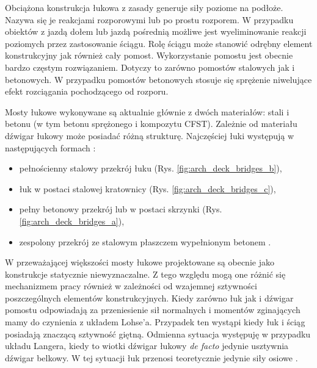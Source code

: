 Obciążona konstrukcja łukowa z zasady generuje siły poziome na podłoże. Nazywa się je reakcjami rozporowymi lub po prostu rozporem. W przypadku obiektów z jazdą dołem lub jazdą pośrednią możliwe jest wyeliminowanie reakcji poziomych przez zastosowanie ściągu. Rolę ściągu może stanowić odrębny element konstrukcyjny jak również cały pomost. Wykorzystanie pomostu jest obecnie bardzo częstym rozwiązaniem. Dotyczy to zarówno pomostów stalowych jak i betonowych. W przypadku pomostów betonowych stosuje się sprężenie niwelujące efekt rozciągania pochodzącego od rozporu.

Mosty łukowe wykonywane są aktualnie głównie z dwóch materiałów: stali i betonu (w tym betonu sprężonego i kompozytu CFST). Zależnie od materiału dźwigar łukowy może posiadać różną strukturę. Najczęściej łuki występują w następujących formach \parencite{Cholewo1965}:
\begin{itemize}
	\item pełnościenny stalowy przekrój łuku (Rys. \ref{fig:arch_deck_bridges_b}),
	\item łuk w postaci stalowej kratownicy (Rys. \ref{fig:arch_deck_bridges_c}),
	\item pełny betonowy przekrój lub w postaci skrzynki (Rys. \ref{fig:arch_deck_bridges_a}),
	\item zespolony przekrój ze stalowym płaszczem wypełnionym betonem  \parencite{Abramski2019}.
\end{itemize}

W przeważającej większości mosty łukowe projektowane są obecnie jako konstrukcje statycznie niewyznaczalne. Z tego względu mogą one różnić się mechanizmem pracy również w zależności od wzajemnej sztywności poszczególnych elementów konstrukcyjnych. Kiedy zarówno łuk jak i dźwigar pomostu odpowiadają za przeniesienie sił normalnych i momentów zginających mamy do czynienia z układem Lohse'a. Przypadek ten wystąpi kiedy łuk i ściąg posiadają znaczącą sztywność giętną. Odmienna sytuacja występuję w przypadku układu Langera, kiedy to wiotki dźwigar łukowy \textit{de facto} jedynie usztywnia dźwigar belkowy. W tej sytuacji łuk przenosi teoretycznie jedynie siły osiowe \parencite{Lin2017}. 

